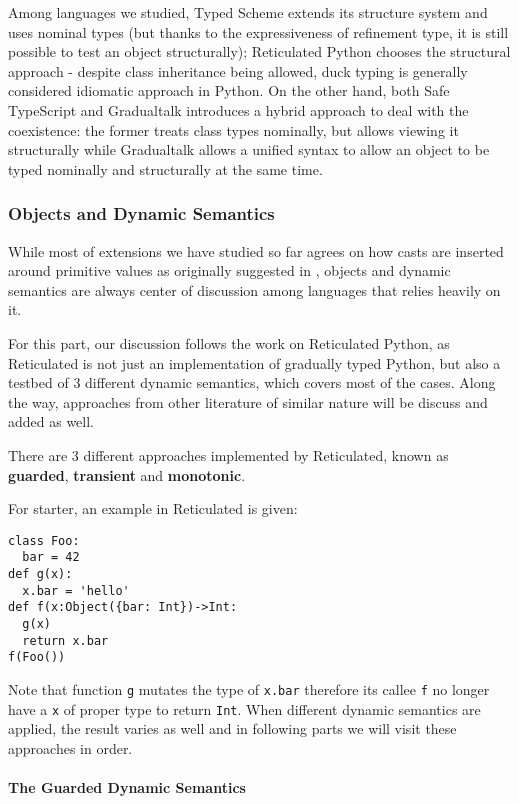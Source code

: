 Among languages we studied, Typed Scheme extends its structure system and uses nominal types
(but thanks to the expressiveness of refinement type, it is still possible to 
test an object structurally);
Reticulated Python chooses the structural approach - despite class inheritance being allowed,
duck typing is generally considered idiomatic approach in Python.
On the other hand, both Safe TypeScript and Gradualtalk
introduces a hybrid approach to deal with the coexistence:
the former treats class types nominally, but allows viewing it structurally
while Gradualtalk allows a unified syntax to allow an object to be typed nominally and structurally at the same time.

\subsubsection{Objects and Dynamic Semantics}

While most of extensions we have studied so far agrees on how casts are inserted
around primitive values as originally suggested in \cite{siek2006gradual},
objects and dynamic semantics are always center of discussion among languages
that relies heavily on it.

For this part, our discussion follows the work on Reticulated Python,
as Reticulated is not just an implementation of gradually typed Python,
but also a testbed of 3 different dynamic semantics, which covers most of the cases.
Along the way, approaches from other literature of similar nature will be discuss and added as well.

There are 3 different approaches implemented by Reticulated, known as \textbf{guarded}, \textbf{transient}
and \textbf{monotonic}.

For starter, an example in Reticulated is given:

\begin{verbatim}
class Foo:
  bar = 42
def g(x):
  x.bar = 'hello'
def f(x:Object({bar: Int})->Int:
  g(x)
  return x.bar
f(Foo())
\end{verbatim}

Note that function \texttt{g} mutates the type of \texttt{x.bar} therefore its callee \texttt{f}
no longer have a \texttt{x} of proper type to return \texttt{Int}.
When different dynamic semantics are applied, the result varies as well and in following parts
we will visit these approaches in order. 

\paragraph{The Guarded Dynamic Semantics}

